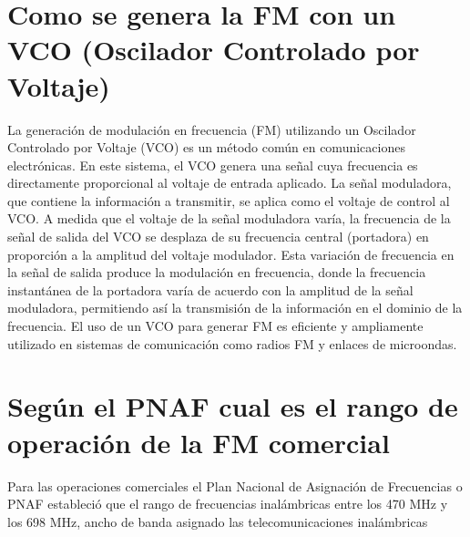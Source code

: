 \documentclass[]{article}
\begin{document}
	\section{Como se genera la FM con un VCO (Oscilador Controlado por Voltaje)}
	La generación de modulación en frecuencia (FM) utilizando un Oscilador Controlado por Voltaje (VCO) es un método común en comunicaciones electrónicas. En este sistema, el VCO genera una señal cuya frecuencia es directamente proporcional al voltaje de entrada aplicado. La señal moduladora, que contiene la información a transmitir, se aplica como el voltaje de control al VCO. A medida que el voltaje de la señal moduladora varía, la frecuencia de la señal de salida del VCO se desplaza de su frecuencia central (portadora) en proporción a la amplitud del voltaje modulador. Esta variación de frecuencia en la señal de salida produce la modulación en frecuencia, donde la frecuencia instantánea de la portadora varía de acuerdo con la amplitud de la señal moduladora, permitiendo así la transmisión de la información en el dominio de la frecuencia. El uso de un VCO para generar FM es eficiente y ampliamente utilizado en sistemas de comunicación como radios FM y enlaces de microondas.
	
	
	\section{Según el PNAF cual es el rango de operación de la FM comercial}
	Para las operaciones comerciales el Plan Nacional de Asignación de Frecuencias o PNAF estableció que el rango de frecuencias inalámbricas entre los 470 MHz y los 698 MHz, ancho de banda asignado las telecomunicaciones inalámbricas
	
	
\end{document}
